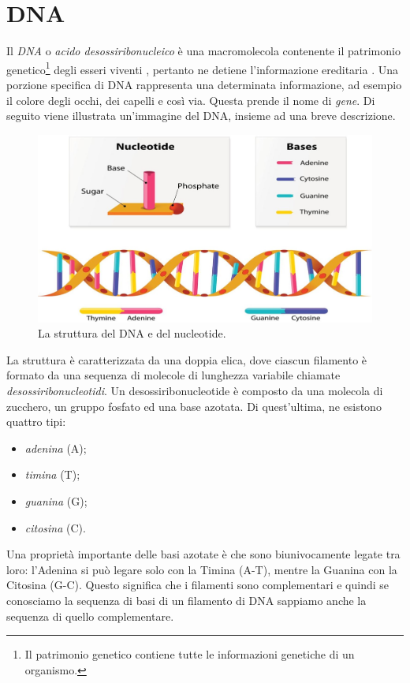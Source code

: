 \section{DNA}
Il \textit{DNA} o \textit{acido desossiribonucleico} è una macromolecola contenente il patrimonio genetico\footnote{Il patrimonio genetico contiene tutte le informazioni genetiche di un organismo.} degli esseri viventi \cite{campbellBiology}, pertanto ne detiene l'informazione ereditaria \cite{BiologySolomon}.
\newline
Una porzione specifica di DNA rappresenta una determinata informazione, ad esempio il colore degli occhi, dei capelli e così via. Questa prende il nome di \textit{gene}\cite{MolecularCellBiology}.
\newline
Di seguito viene illustrata un'immagine del DNA, insieme ad una breve descrizione.
\newline
\begin{figure}[h!]
	\includegraphics[width=\linewidth]{DNAStructure.jpg}
 	\caption{La struttura del DNA e del nucleotide.}
  	\label{fig:DnaAndNucleotideStructure}
\end{figure}
\newline
La struttura è caratterizzata da una doppia elica, dove ciascun filamento è formato da una sequenza di molecole di lunghezza variabile chiamate \textit{desossiribonucleotidi}.
\newline
Un desossiribonucleotide è composto da una molecola di zucchero, un gruppo fosfato ed una base azotata. Di quest'ultima, ne esistono quattro tipi:
\begin{itemize}
	\item \textit{adenina} (A);
	\item \textit{timina} (T);
	\item \textit{guanina} (G);
	\item \textit{citosina} (C).
\end{itemize}
Una proprietà importante delle basi azotate è che sono biunivocamente legate tra loro: l'Adenina si può legare solo con la Timina (A-T), mentre la Guanina con la Citosina (G-C). Questo significa che i filamenti sono complementari e quindi se conosciamo la sequenza di basi di un filamento di DNA sappiamo anche la sequenza di quello complementare.

